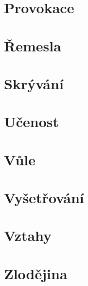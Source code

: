 \documentclass[../main.tex]{subfiles}
\begin{document}
\section{Provokace}
\label{sec:provokace}

\section{Řemesla}
\label{sec:remesla}

\section{Skrývání}
\label{sec:skryvani}

\section{Učenost}
\label{sec:ucenost}

\section{Vůle}
\label{sec:vule}

\section{Vyšetřování}
\label{sec:vysetrovani}

\section{Vztahy}
\label{sec:vztahy}

\section{Zlodějina}
\label{sec:zlodejina}
\end{document}
